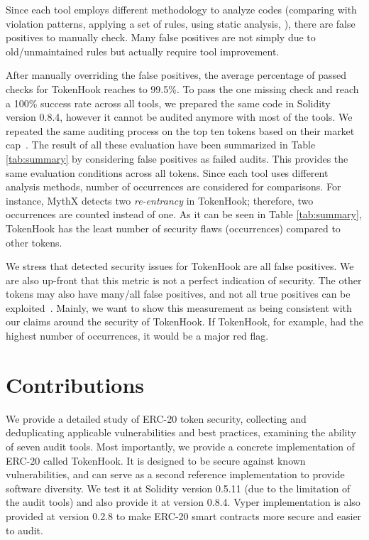 Since each tool employs different methodology to analyze codes (\eg comparing with violation patterns, applying a set of rules, using static analysis, \etc), there are false positives to manually check. Many false positives are not simply due to old/unmaintained rules but actually require tool improvement.


After manually overriding the false positives, the average percentage of passed checks for TokenHook reaches to 99.5\%. To pass the one missing check and reach a 100\% success rate across all tools, we prepared the same code in Solidity version 0.8.4, however it cannot be audited anymore with most of the tools. We repeated the same auditing process on the top ten tokens based on their market cap~\cite{TokenTracker}. The result of all these evaluation have been summarized in Table \ref{tab:summary} by considering false positives as failed audits. This provides the same evaluation conditions across all tokens. Since each tool uses different analysis methods, number of occurrences are considered for comparisons. For instance, MythX detects two \textit{re-entrancy} in TokenHook; therefore, two occurrences are counted instead of one. As it can be seen in Table \ref{tab:summary}, TokenHook has the least number of security flaws (occurrences) compared to other tokens.

We stress that detected security issues for TokenHook are all false positives. We are also up-front that this metric is not a perfect indication of security. The other tokens may also have many/all false positives, and not all true positives can be exploited~\cite{VulExp}. Mainly, we want to show this measurement as being consistent with our claims around the security of TokenHook. If TokenHook, for example, had the highest number of occurrences, it would be a major red flag.

\section{Contributions}
We provide a detailed study of ERC-20 token security, collecting and deduplicating applicable vulnerabilities and best practices, examining the ability of seven audit tools. Most importantly, we provide a concrete implementation of ERC-20 called TokenHook. It is designed to be secure against known vulnerabilities, and can serve as a second reference implementation to provide software diversity. We test it at Solidity version 0.5.11 (due to the limitation of the audit tools) and also provide it at version 0.8.4. Vyper implementation is also provided at version 0.2.8 to make ERC-20 smart contracts more secure and easier to audit.

